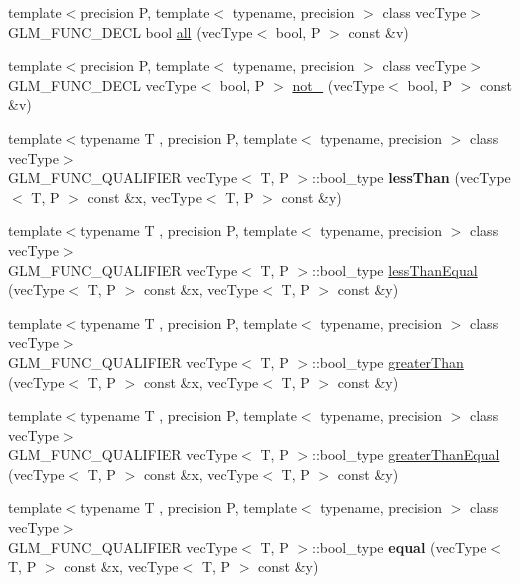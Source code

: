 \begin{DoxyCompactItemize}
\item 
{\footnotesize template$<$precision P, template$<$ typename, precision $>$ class vec\+Type$>$ }\\G\+L\+M\+\_\+\+F\+U\+N\+C\+\_\+\+D\+E\+CL bool \hyperlink{group__core__func__vector__relational_ga14bbc94f2ae2774a1d64d91f8767773e}{all} (vec\+Type$<$ bool, P $>$ const \&v)
\item 
{\footnotesize template$<$precision P, template$<$ typename, precision $>$ class vec\+Type$>$ }\\G\+L\+M\+\_\+\+F\+U\+N\+C\+\_\+\+D\+E\+CL vec\+Type$<$ bool, P $>$ \hyperlink{group__core__func__vector__relational_ga4329ecbc2ef012c9ec704bd09da1f177}{not\+\_\+} (vec\+Type$<$ bool, P $>$ const \&v)
\item 
{\footnotesize template$<$typename T , precision P, template$<$ typename, precision $>$ class vec\+Type$>$ }\\G\+L\+M\+\_\+\+F\+U\+N\+C\+\_\+\+Q\+U\+A\+L\+I\+F\+I\+ER vec\+Type$<$ T, P $>$\+::bool\+\_\+type {\bfseries less\+Than} (vec\+Type$<$ T, P $>$ const \&x, vec\+Type$<$ T, P $>$ const \&y)\hypertarget{namespaceglm_a9ea052832f152d1233c6fa27df62f2fc}{}\label{namespaceglm_a9ea052832f152d1233c6fa27df62f2fc}

\item 
{\footnotesize template$<$typename T , precision P, template$<$ typename, precision $>$ class vec\+Type$>$ }\\G\+L\+M\+\_\+\+F\+U\+N\+C\+\_\+\+Q\+U\+A\+L\+I\+F\+I\+ER vec\+Type$<$ T, P $>$\+::bool\+\_\+type \hyperlink{group__core__func__vector__relational_ga2167b22ac086c5791a4740932b62b685}{less\+Than\+Equal} (vec\+Type$<$ T, P $>$ const \&x, vec\+Type$<$ T, P $>$ const \&y)
\item 
{\footnotesize template$<$typename T , precision P, template$<$ typename, precision $>$ class vec\+Type$>$ }\\G\+L\+M\+\_\+\+F\+U\+N\+C\+\_\+\+Q\+U\+A\+L\+I\+F\+I\+ER vec\+Type$<$ T, P $>$\+::bool\+\_\+type \hyperlink{group__core__func__vector__relational_gac9163d451231eb3eaae2c6b3da5add6a}{greater\+Than} (vec\+Type$<$ T, P $>$ const \&x, vec\+Type$<$ T, P $>$ const \&y)
\item 
{\footnotesize template$<$typename T , precision P, template$<$ typename, precision $>$ class vec\+Type$>$ }\\G\+L\+M\+\_\+\+F\+U\+N\+C\+\_\+\+Q\+U\+A\+L\+I\+F\+I\+ER vec\+Type$<$ T, P $>$\+::bool\+\_\+type \hyperlink{group__core__func__vector__relational_gad1385064aa2fc7aaae37aa95daea9c31}{greater\+Than\+Equal} (vec\+Type$<$ T, P $>$ const \&x, vec\+Type$<$ T, P $>$ const \&y)
\item 
{\footnotesize template$<$typename T , precision P, template$<$ typename, precision $>$ class vec\+Type$>$ }\\G\+L\+M\+\_\+\+F\+U\+N\+C\+\_\+\+Q\+U\+A\+L\+I\+F\+I\+ER vec\+Type$<$ T, P $>$\+::bool\+\_\+type {\bfseries equal} (vec\+Type$<$ T, P $>$ const \&x, vec\+Type$<$ T, P $>$ const \&y)\hypertarget{namespaceglm_a4a4eb228ace536873b64b9690d14e971}{}\label{namespaceglm_a4a4eb228ace536873b64b9690d14e971}


\end{DoxyCompactItemize}
